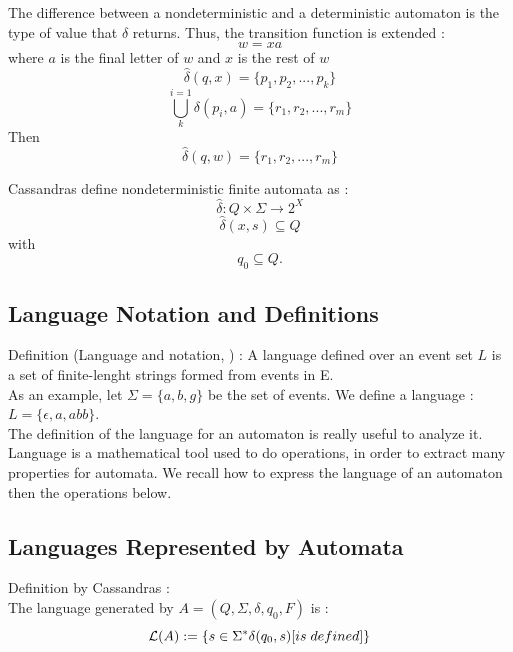 The difference between a nondeterministic and a deterministic automaton is the type of value that $\delta$ returns. Thus, the transition function is extended : \\
\begin{equation*}
w=xa
\end{equation*} where $a$ is the final letter of $w$ and $x$ is the rest of $w$
\begin{equation*}
\widehat{\delta}(q,x)=\{p_1,p_2,...,p_k\}
\end{equation*}
\begin{equation*}
\bigcup_{k}^{i=1}\delta(p_i,a) = \{r_1,r_2,...,r_m\}
\end{equation*}
Then \begin{equation*}
\widehat{\delta}(q,w) = \{r_1,r_2,...,r_m\}
\end{equation*}

Cassandras define nondeterministic finite automata as \cite{cassandras2009introduction}:
\begin{equation*}
\widehat{\delta} : Q × \Sigma \rightarrow 2^X
\end{equation*}
\begin{equation*}
\widehat{\delta}(x, s) \subseteq Q
\end{equation*}
with
\begin{equation*}
q_0 \subseteq Q.
\end{equation*}

\subsection{Language Notation and Definitions}
Definition (Language and notation, \cite{cassandras2009introduction})  : A language defined over an event set $L$ is a set of finite-lenght strings formed from events in E.\\
As an example, let $\Sigma=\{a, b, g\}$ be the set of events. We define a language :
$L=\{\epsilon, a, abb\}$.\\
The definition of the language for an automaton is really useful to analyze it. Language is a mathematical tool used to do operations, in order to extract many properties for automata. We recall how to express the language of an automaton then the operations below.

\subsection{Languages Represented by Automata}
Definition by Cassandras\cite{cassandras2009introduction} :\\
The language generated by $ A = ( Q, \Sigma,\delta,q_0,F )$ is :
\begin{equation*}
\mathcal{L}(A) := \{ s \in \Sigma^* \delta(q_0,s) \text[is \hspace{0.1cm} defined] \}
\end{equation*}



